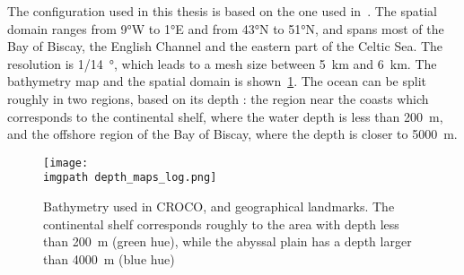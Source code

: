 \documentclass[../../Main_ManuscritThese.tex]{subfiles}
\newcommand{\CROCO}{CROCO}
\newcommand\imgpath{/home/victor/acadwriting/Manuscrit/Text/Chapter5/img/}
\begin{document}
The configuration used in this thesis is based on the one used
in~\cite{boutet_estimation_2015}. The spatial domain ranges from
\ang{9}W to \ang{1}E and from \ang{43}N to \ang{51}N, and spans most
of the Bay of Biscay, the English Channel and the eastern part of the
Celtic Sea.  The resolution is \SI{1/14}{\degree}, which leads to a
mesh size between \SI{5}{\kilo\metre} and \SI{6}{\kilo\metre}. The
bathymetry map and the spatial domain is
shown~\cref{fig:depth_maps}. The ocean can be split roughly in two
regions, based on its depth : the region near the coasts which
corresponds to the continental shelf, where the water depth is less
than \SI{200}{\meter}, and the offshore region of the Bay of Biscay,
where the depth is closer to \SI{5000}{\meter}.
\begin{figure}[ht]
  \centering
  \texttt{[image: \\imgpath depth\_maps\_log.png]}
  \caption[Bathymetry chart of the domain
  modelled]{\label{fig:depth_maps} Bathymetry used in \CROCO, and
    geographical landmarks. The continental shelf corresponds roughly
    to the area with depth less than \SI{200}{\meter} (green hue),
    while the abyssal plain has a depth larger than \SI{4000}{\meter}
    (blue hue)}
\end{figure}
\end{document}
